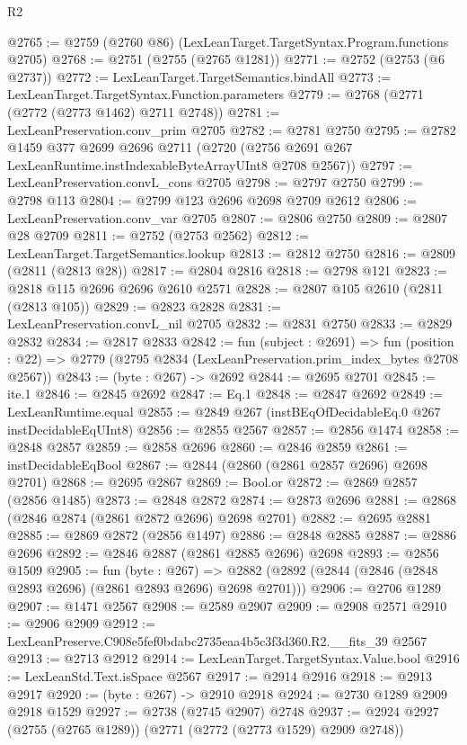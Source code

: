 \begin{lexlean}{R2}
\begin{coremodule}
@2765 := @2759 (@2760 @86) (LexLeanTarget.TargetSyntax.Program.functions @2705)
@2768 := @2751 (@2755 (@2765 @1281))
@2771 := @2752 (@2753 (@6 @2737))
@2772 := LexLeanTarget.TargetSemantics.bindAll
@2773 := LexLeanTarget.TargetSyntax.Function.parameters
@2779 := @2768 (@2771 (@2772 (@2773 @1462) @2711 @2748))
@2781 := LexLeanPreservation.conv_prim @2705
@2782 := @2781 @2750
@2795 := @2782
    @1459
    @377
    @2699
    @2696
    @2711
    (@2720 (@2756 @2691 @267 LexLeanRuntime.instIndexableByteArrayUInt8 @2708 @2567))
@2797 := LexLeanPreservation.convL_cons @2705
@2798 := @2797 @2750
@2799 := @2798 @113
@2804 := @2799 @123 @2696 @2698 @2709 @2612
@2806 := LexLeanPreservation.conv_var @2705
@2807 := @2806 @2750
@2809 := @2807 @28 @2709
@2811 := @2752 (@2753 @2562)
@2812 := LexLeanTarget.TargetSemantics.lookup
@2813 := @2812 @2750
@2816 := @2809 (@2811 (@2813 @28))
@2817 := @2804 @2816
@2818 := @2798 @121
@2823 := @2818 @115 @2696 @2696 @2610 @2571
@2828 := @2807 @105 @2610 (@2811 (@2813 @105))
@2829 := @2823 @2828
@2831 := LexLeanPreservation.convL_nil @2705
@2832 := @2831 @2750
@2833 := @2829 @2832
@2834 := @2817 @2833
@2842 := fun (subject : @2691) =>
  fun (position : @22) => @2779 (@2795 @2834 (LexLeanPreservation.prim_index_bytes @2708 @2567))
@2843 := (byte : @267) -> @2692
@2844 := @2695 @2701
@2845 := ite.{1}
@2846 := @2845 @2692
@2847 := Eq.{1}
@2848 := @2847 @2692
@2849 := LexLeanRuntime.equal
@2855 := @2849 @267 (instBEqOfDecidableEq.{0} @267 instDecidableEqUInt8)
@2856 := @2855 @2567
@2857 := @2856 @1474
@2858 := @2848 @2857
@2859 := @2858 @2696
@2860 := @2846 @2859
@2861 := instDecidableEqBool
@2867 := @2844 (@2860 (@2861 @2857 @2696) @2698 @2701)
@2868 := @2695 @2867
@2869 := Bool.or
@2872 := @2869 @2857 (@2856 @1485)
@2873 := @2848 @2872
@2874 := @2873 @2696
@2881 := @2868 (@2846 @2874 (@2861 @2872 @2696) @2698 @2701)
@2882 := @2695 @2881
@2885 := @2869 @2872 (@2856 @1497)
@2886 := @2848 @2885
@2887 := @2886 @2696
@2892 := @2846 @2887 (@2861 @2885 @2696) @2698
@2893 := @2856 @1509
@2905 := fun (byte : @267) =>
  @2882 (@2892 (@2844 (@2846 (@2848 @2893 @2696) (@2861 @2893 @2696) @2698 @2701)))
@2906 := @2706 @1289
@2907 := @1471 @2567
@2908 := @2589 @2907
@2909 := @2908 @2571
@2910 := @2906 @2909
@2912 := LexLeanPreserve.C908e5fef0bdabc2735eaa4b5c3f3d360.R2.__fits_39 @2567
@2913 := @2713 @2912
@2914 := LexLeanTarget.TargetSyntax.Value.bool
@2916 := LexLeanStd.Text.isSpace @2567
@2917 := @2914 @2916
@2918 := @2913 @2917
@2920 := (byte : @267) -> @2910 @2918
@2924 := @2730 @1289 @2909 @2918 @1529
@2927 := @2738 (@2745 @2907) @2748
@2937 := @2924 @2927 (@2755 (@2765 @1289)) (@2771 (@2772 (@2773 @1529) @2909 @2748))

\end{coremodule}
\end{lexlean}
